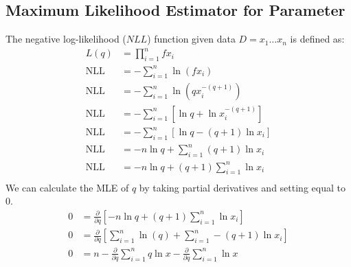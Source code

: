 \documentclass[]{article} %
\begin{document}
 \subsection{Maximum Likelihood Estimator for Parameter}
 The negative log-likelihood ($NLL$) function given data $D = x_1 \ldots x_n$ is defined as:
 \begin{align*}
 L(q) &= \prod_{i=1}^{n} f{x_i}\\
 \text{NLL} &= -\sum_{i=1}^{n} \ln(f{x_i}) \\
 \text{NLL} &= -\sum_{i=1}^{n}\ln(qx_i^{-(q+1)})\\
 \text{NLL} &= -\sum_{i=1}^{n}\left[\ln{q} + \ln{x_i^{-(q+1)}}\right]\\
 \text{NLL} &= -\sum_{i=1}^{n}\left[\ln{q} - (q+1)\ln{x_i}\right]\\
 \text{NLL} &= -n\ln{q} + \sum_{i=1}^{n}(q+1)\ln{x_i}\\
 \text{NLL} &= -n\ln{q} + (q+1)\sum_{i=1}^{n}\ln{x_i}\\
  \end{align*}
 We can calculate the MLE of $q$ by taking partial derivatives and setting equal to $0$.
  \begin{align*}
 0 &= \frac{\partial}{\partial q}\left[ 
 -n\ln{q} + 
 (q+1)\sum_{i=1}^{n}\ln{x_i}
 \right] \\
 0 &= \frac{\partial}{\partial q}\left[ \sum_{i=1}^{n}\ln(q) + \sum_{i=1}^{n} -(q+1)\ln{x_i}\right] \\
 0 &= n - \frac{\partial}{\partial q}\sum_{i=1}^{n} q\ln{x} - \frac{\partial}{\partial q} \sum_{i=1}^{n} \ln{x} 
 \end{align*}


\end{document}
